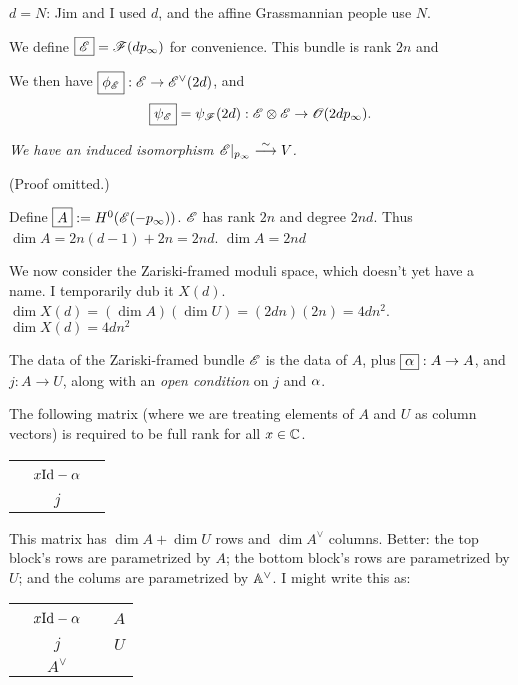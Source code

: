 {$\boxed{d=N}$:  Jim and I used $d$, and the affine Grassmannian people use $N$. 

We define $\boxed{{\mathscr{E}}} = {\mathscr{F}} (d p_{\infty})$ for convenience.  This bundle is rank $2n$ and 

We then have $\boxed{\phi_{{\mathscr{E}}}} : {\mathscr{E}} \rightarrow {\mathscr{E}}^\vee(2d)$, and \begin{equation}
  \boxed{\psi_{{\mathscr{E}}}} = \psi_{{\mathscr{F}}}(2d) : {\mathscr{E}} \otimes {\mathscr{E}} \rightarrow {\mathscr{O}}(2d p_{\infty}).
  \label{eq:p20}
  \end{equation}

{\em We have an induced isomorphism ${\mathscr{E}}|_{p_{\infty}} \overset \sim \longrightarrow V$.}

(Proof omitted.)


Define $\boxed{A}  := H^0({\mathscr{E}}(-p_\infty))$.   ${\mathscr{E}}$ has rank $2n$ and degree $2nd$.
Thus $\dim A = 2n(d-1) + 2n = 2nd$.   $\boxed{\boxed{\dim A = 2nd}}$

\point We now consider the Zariski-framed moduli space, which doesn't yet have a name. I temporarily dub it $\boxed{X(d)}$.  $\dim X(d)  = (\dim A)(\dim U)= (2dn)(2n)=4dn^2$. $\boxed{\boxed{\dim X(d) = 4dn^2}}$\label{s:dimXd}

\point The data of the Zariski-framed bundle ${\mathscr{E}}$ is the data of $A$, plus $\boxed{\alpha}: A \rightarrow A$, and $\boxed{j}:A \rightarrow U$,
along with an {\em open condition} on $j$ and $\alpha$.

The following matrix (where we are treating elements of $A$ and $U$  as column vectors) is required
to be full rank for all $x \in \mathbb{C}$.

\begin{tabular}{|ccc|}
  \hline
  & &  \\
  & $x \rm{Id}-\alpha$ &  \\
  & &  \\
\hline
& $j$ &  \\
\hline
\end{tabular}

This matrix has $\dim A + \dim U$ rows and $\dim A^\vee$ columns.  Better:  the top block's rows are parametrized by $A$; the bottom block's rows are parametrized by $U$; and the colums are parametrized by $\mathbb{A}^\vee$.  I might write this as:


\begin{tabular}{|ccc|c}
  \hline
  & & & \\
  & $x \rm{Id}-\alpha$ & & $A$ \\
  & & & \\
\hline
& $j$ & & $U$ \\
\hline
& $A^\vee$ & &  \\
\end{tabular}



}
